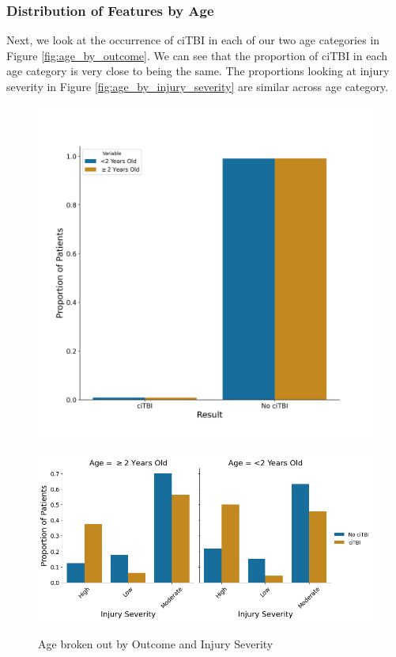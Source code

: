 \documentclass[11pt]{amsart}
\begin{document}
\subsubsection{Distribution of Features by Age}

Next, we look at the occurrence of ciTBI in each of our two age categories in Figure \ref{fig:age_by_outcome}. We can see that the proportion of ciTBI in each age category is very close to being the same. The proportions looking at injury severity in Figure \ref{fig:age_by_injury_severity} are similar across age category.
\FloatBarrier
\begin{figure}
	\begin{minipage}[b]{0.5\linewidth}
		\centering
		\includegraphics[width=\textwidth]{age_comparison_by_group.png}
		\label{fig:age_by_outcome}
	\end{minipage}%
	\begin{minipage}[b]{0.5\linewidth}
		\centering
		\includegraphics[width=\textwidth]{age_by_injuryseverity.png}
		\label{fig:age_by_injury_severity}
	\end{minipage}
	\caption{Age broken out by Outcome and Injury Severity}\label{fig:age_distributions}
\end{figure}
\FloatBarrier
\end{document}
